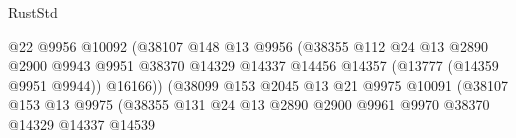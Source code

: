 \begin{lexlean}{RustStd}
\begin{coremodule}
                                                @22
                                                @9956
                                                @10092
                                                (@38107
                                                  @148
                                                  @13
                                                  @9956
                                                  (@38355
                                                    @112
                                                    @24
                                                    @13
                                                    @2890
                                                    @2900
                                                    @9943
                                                    @9951
                                                    @38370
                                                    @14329
                                                    @14337
                                                    @14456
                                                    @14357
                                                    (@13777 (@14359 @9951 @9944))
                                                    @16166))
                                                (@38099
                                                  @153
                                                  @2045
                                                  @13
                                                  @21
                                                  @9975
                                                  @10091
                                                  (@38107
                                                    @153
                                                    @13
                                                    @9975
                                                    (@38355
                                                      @131
                                                      @24
                                                      @13
                                                      @2890
                                                      @2900
                                                      @9961
                                                      @9970
                                                      @38370
                                                      @14329
                                                      @14337
                                                      @14539

\end{coremodule}
\end{lexlean}
